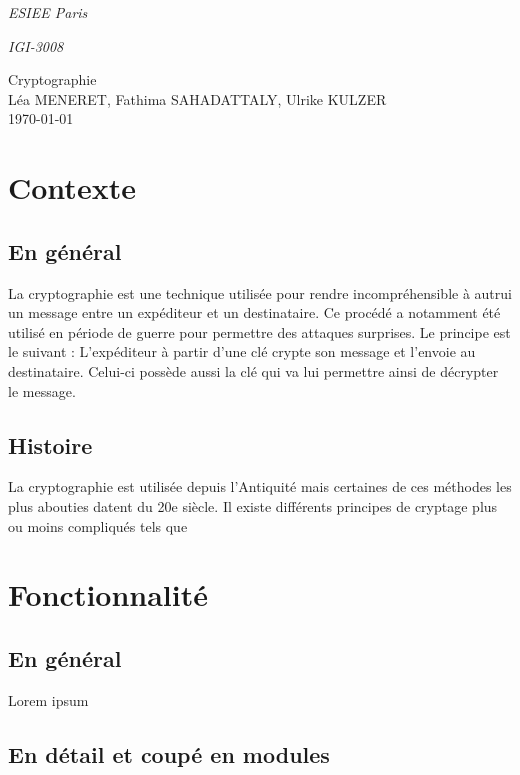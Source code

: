 \documentclass[a4paper,12pt,abstracton,titlepage]{scrartcl}
\begin{document}

{\Large\noindent \emph{ESIEE Paris}}

{\Large\noindent \emph{IGI-3008}}
\begin{center}
	{\large Cryptographie	 \\ \large Léa MENERET, Fathima SAHADATTALY, Ulrike KULZER \\ \today}
\end{center}

\setcounter{page}{1} %

\section{Contexte}
\subsection{En général}
La cryptographie est une technique utilisée pour rendre incompréhensible à autrui un message entre un expéditeur et un destinataire. Ce procédé a notamment été utilisé en période de guerre pour permettre des attaques surprises. 
Le principe est le suivant : L’expéditeur à partir d’une clé crypte son message et l’envoie au destinataire. Celui-ci possède aussi la clé qui va lui permettre ainsi de décrypter le message.

\subsection{Histoire}
La cryptographie est utilisée depuis l’Antiquité mais certaines de ces méthodes les plus abouties datent du 20e siècle. Il existe différents principes de cryptage plus ou moins compliqués tels que


\section{Fonctionnalité}
\subsection{En général}
Lorem ipsum

\subsection{En détail et coupé en modules}
\end{document}
